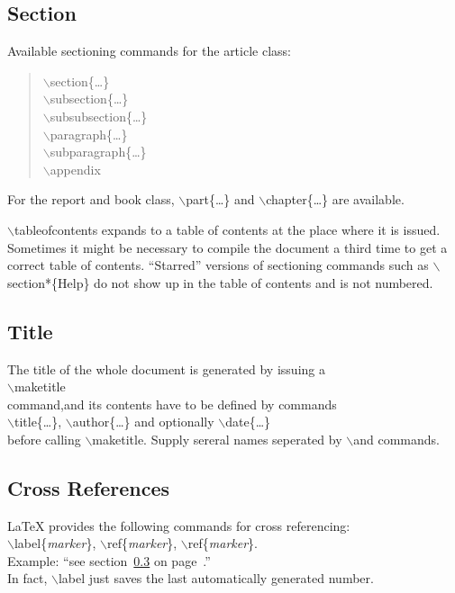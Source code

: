 \documentclass[11pt,a4paper]{article}
\begin{document}
\subsection{Section}
Available sectioning commands for the article class:\\
\begin{quote}
    $\backslash$section\{\ldots\}\\
    $\backslash$subsection\{\ldots\}\\
    $\backslash$subsubsection\{\ldots\}\\
    $\backslash$paragraph\{\ldots\}\\
    $\backslash$subparagraph\{\ldots\}\\
    $\backslash$appendix\\
\end{quote}
For the report and book class,
$\backslash$part\{\ldots\} and $\backslash$chapter\{\ldots\} are available.

$\backslash$tableofcontents expands to a table of contents at the place where it is 
issued. Sometimes it might be necessary to compile the document a third time to get a 
correct table of contents. ``Starred'' versions of sectioning commands such as 
$\backslash$section*\{Help\} do not show up in the table of contents and is 
not numbered. 
\subsection{Title}
The title of the whole document is generated by issuing a\\ 
$\backslash$maketitle \\
command,and its contents have to be defined by commands\\
$\backslash$title\{\ldots\}, $\backslash$author\{\ldots\} and optionally 
$\backslash$date\{\ldots\} \\
before calling $\backslash$maketitle. Supply sereral names seperated by 
$\backslash$and commands.
\subsection{Cross References}\label{CR}
\LaTeX{} provides the following commands for cross referencing:\\
$\backslash$label\{\textsl{marker}\}, $\backslash$ref\{\textsl{marker}\}, 
$\backslash$ref\{\textsl{marker}\}.\\
Example: ``see section~\ref{CR} on page~\pageref{CR}.''\\
In fact, $\backslash$label just saves the last automatically generated number.
\end{document}
